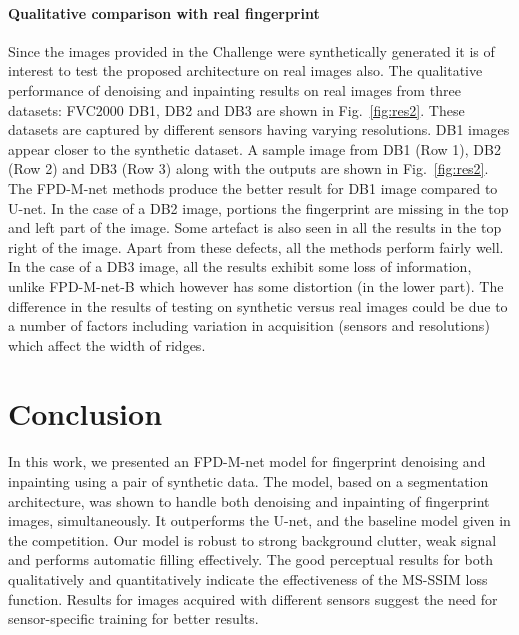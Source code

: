 \documentclass{llncs}
\begin{document}
\paragraph{\textbf{Qualitative comparison with real fingerprint}}
Since the images provided in the Challenge were synthetically generated it is of interest to test the proposed architecture on real images also. The qualitative performance of denoising and inpainting results on real images from three datasets: FVC2000 DB1, DB2 and DB3 \cite{maio2002fvc2000} are shown in Fig.~\ref{fig:res2}. These datasets are captured by different sensors having varying resolutions. DB1 images appear closer to the synthetic dataset. A sample image from DB1 (Row 1), DB2 (Row 2) and DB3 (Row 3) along with the outputs are shown in Fig.~\ref{fig:res2}. The FPD-M-net methods produce the better result for DB1 image compared to U-net. In the case of a DB2 image, portions the fingerprint are missing in the top and left part of the image. Some artefact is also seen in all the results in the top right of the image. Apart from these defects, all the methods perform fairly well. In the case of a DB3 image, all the results exhibit some loss of information, unlike FPD-M-net-B which however has some distortion (in the lower part). The difference in the results of testing on synthetic versus real images could be due to a number of factors including variation in acquisition  (sensors and resolutions) which affect the width of ridges.

\section{Conclusion}
In this work, we presented an FPD-M-net model for fingerprint denoising and inpainting using a pair of synthetic data. The model, based on a segmentation architecture, was shown to handle both denoising and inpainting of fingerprint images, simultaneously. It outperforms the U-net, and the baseline model given in the competition. Our model is robust to strong background clutter, weak signal and performs automatic filling effectively. The good perceptual results for both qualitatively and quantitatively indicate the effectiveness of the MS-SSIM loss function. Results for images acquired with different sensors suggest the need for sensor-specific training for better results.

%
%


\end{document}
